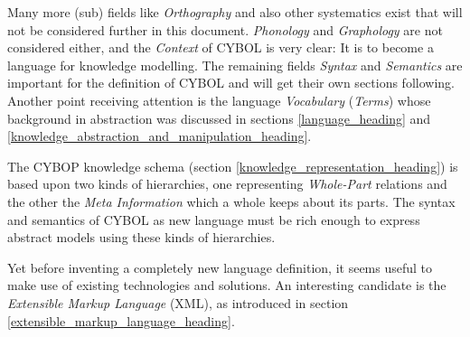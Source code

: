 Many more (sub) fields like \emph{Orthography} and also other systematics
\cite{teachsam} exist that will not be considered further in this document.
\emph{Phonology} and \emph{Graphology} are not considered either, and the
\emph{Context} of CYBOL is very clear: It is to become a language for knowledge
modelling. The remaining fields \emph{Syntax} and \emph{Semantics} are
important for the definition of CYBOL and will get their own sections
following. Another point receiving attention is the language \emph{Vocabulary}
(\emph{Terms}) whose background in abstraction was discussed in sections
\ref{language_heading} and \ref{knowledge_abstraction_and_manipulation_heading}.

The CYBOP knowledge schema (section \ref{knowledge_representation_heading}) is
based upon two kinds of hierarchies, one representing \emph{Whole-Part}
relations and the other the \emph{Meta Information} which a whole keeps about
its parts. The syntax and semantics of CYBOL as new language must be rich
enough to express abstract models using these kinds of hierarchies.

Yet before inventing a completely new language definition, it seems useful to
make use of existing technologies and solutions. An interesting candidate is
the \emph{Extensible Markup Language} (XML), as introduced in section
\ref{extensible_markup_language_heading}.





%
